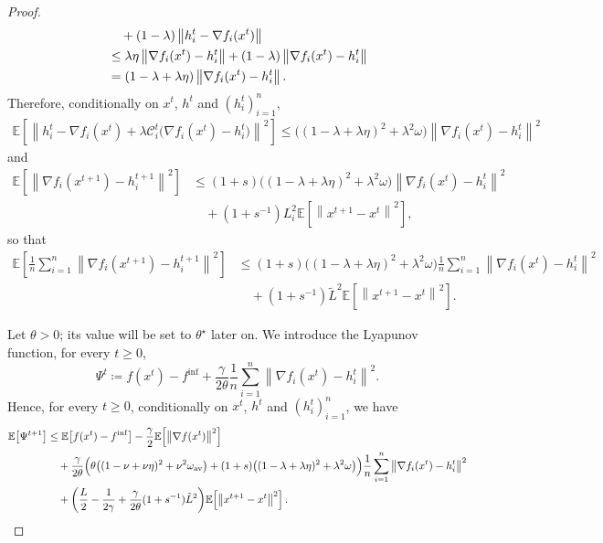 \documentclass{article} %
\newcommand{\eqdef}{\coloneqq}
\theoremstyle{plain}
\theoremstyle{definition}
\theoremstyle{remark}
\newcommand{\sqnorm}[1]{\left\| #1 \right\|^2}
\newcommand{\Exp}[1]{\mathbb{E}\!\left[ #1 \right]}
\newcommand{\oma}{\omega_{\mathrm{av}}}
\begin{document}
\begin{proof}
\begin{align*}
   &\quad + (1-\lambda)\left\|h_i^{t}-\nabla f_i(x^t)\right\|\\
   &\leq  \lambda\eta\left\|\nabla f_i(x^t)-h_i^{t}\right\|+ (1-\lambda)\left\|\nabla f_i(x^t)-h_i^{t}\right\|\notag\\
   &=(1-\lambda+\lambda\eta)\left\|\nabla f_i(x^t)-h_i^t\right\|.
   \end{align*}
   Therefore, conditionally on $x^t$, $h^t$ and $(h_i^t)_{i=1}^n$, 
   \begin{align*}
   \Exp{\sqnorm{h_i^{t}-\nabla f_i(x^{t}) +\lambda \mathcal{C}_i^t\big(\nabla f_i(x^t)-h_i^t\big)  }}\leq\big((1-\lambda+\lambda\eta)^2+\lambda^2\omega\big) \sqnorm{\nabla f_i(x^t)-h_i^t}
   \end{align*}
   and
   \begin{align*}
   \Exp{\sqnorm{\nabla f_i(x^{t+1})-h_i^{t+1}}}&\leq (1+s)\big((1-\lambda+\lambda\eta)^2+\lambda^2\omega\big) \sqnorm{\nabla f_i(x^{t})-h_i^{t}}\\
   &\quad+(1+s^{-1})L_i^2\Exp
   {\sqnorm{x^{t+1}-x^{t}}},
   \end{align*}
   so that
   \begin{align*}
   \Exp{\frac{1}{n}\sum_{i=1}^n \sqnorm{\nabla f_i(x^{t+1})-h_i^{t+1}}}&
   \leq (1+s)\big((1-\lambda+\lambda\eta)^2+\lambda^2\omega\big) \frac{1}{n}\sum_{i=1}^n \sqnorm{\nabla f_i(x^t)-h_i^{t}}\\
   &\quad+(1+s^{-1})\tilde{L}^2\Exp
   {\sqnorm{x^{t+1}-x^{t}}}.
   \end{align*}

   Let $\theta>0$; its value will be set to $\theta^\star$ later on. We introduce the Lyapunov function, for every $t\geq 0$,
   \begin{equation*}
   \Psi^t \eqdef f(x^t)-f^{\inf} + \frac{\gamma}{2\theta}  \frac{1}{n}\sum_{i=1}^n \sqnorm{\nabla f_i(x^t)-h_i^{t}}.
   \end{equation*}
   Hence, for every $t\geq 0$, conditionally on $x^t$, $h^t$ and $(h_i^t)_{i=1}^n$, we have
   \begin{align}
   \Exp{\Psi^{t+1}} &\leq \Exp{f(x^t) - f^{\inf}} - \frac{\gamma}{2} \Exp{\sqnorm{\nabla f(x^t)}}\notag \\
   &\quad +\frac{ \gamma }{2\theta}\Big( \theta\big((1-\nu+\nu\eta)^2+\nu^2\oma\big)\notag+(1+s)\big((1-\lambda+\lambda\eta)^2+\lambda^2\omega\big)
   \Big) \frac{1}{n}\sum_{i=1}^n \sqnorm{\nabla f_i(x^t)-h_i^{t}}\label{eqq1}\\
   &\quad+ \left(\frac{ L}{2}-\frac{1}{2\gamma}+\frac{\gamma}{2\theta}(1+s^{-1})\tilde{L}^2\right)\!\Exp{\sqnorm{x^{t+1}-x^t}}.\notag
   \end{align}
   

\end{proof}
\end{document}
